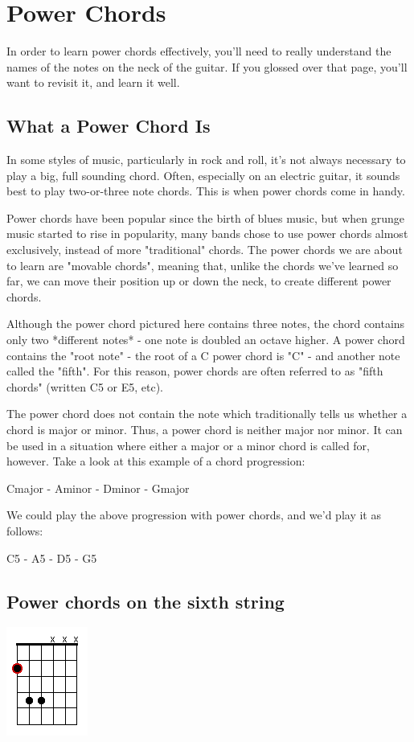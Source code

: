 \section{Power Chords}
In order to learn power chords effectively, you'll need to really understand the names of the notes on the neck of the guitar. If you glossed over that page, you'll want to revisit it, and learn it well.

\subsection{What a Power Chord Is}

In some styles of music, particularly in rock and roll, it's not always necessary to play a big, full sounding chord. Often, especially on an electric guitar, it sounds best to play two-or-three note chords. This is when power chords come in handy.

Power chords have been popular since the birth of blues music, but when grunge music started to rise in popularity, many bands chose to use power chords almost exclusively, instead of more "traditional" chords. The power chords we are about to learn are "movable chords", meaning that, unlike the chords we've learned so far, we can move their position up or down the neck, to create different power chords.

Although the power chord pictured here contains three notes, the chord contains only two *different notes* - one note is doubled an octave higher. A power chord contains the "root note" - the root of a C power chord is "C" - and another note called the "fifth". For this reason, power chords are often referred to as "fifth chords" (written C5 or E5, etc).

The power chord does not contain the note which traditionally tells us whether a chord is major or minor. Thus, a power chord is neither major nor minor. It can be used in a situation where either a major or a minor chord is called for, however. Take a look at this example of a chord progression:

Cmajor - Aminor - Dminor - Gmajor

We could play the above progression with power chords, and we'd play it as follows:

C5 - A5 - D5 - G5

\subsection{Power chords on the sixth string}
\includegraphics{partfour/powerchord6.png}

